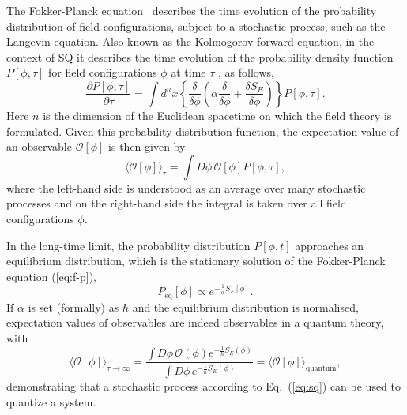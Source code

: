 The Fokker-Planck equation~\cite{risken1996fokker} describes the time evolution of the probability distribution of field configurations, subject to a stochastic process, such as the Langevin equation. Also known as the Kolmogorov forward equation, in the context of SQ it describes the time evolution of the probability density function $P[\phi,\tau]$ for field configurations $\phi$ at time $\tau$ \cite{Damgaard:1987rr,Namiki:1992wf}, as follows,
\begin{equation}
 \frac{\partial P[\phi, \tau]}{\partial \tau} = \int d^nx \left\{
 \frac{\delta}{\delta \phi}
 \left(\alpha\frac{\delta }{\delta \phi} + \frac{\delta S_E}{\delta \phi} \right)
 \right\} P[\phi, \tau].
 \label{eq:f-p}
\end{equation}
Here $n$ is the dimension of the Euclidean spacetime on which the field theory is formulated.  Given this probability distribution function, the expectation value of an observable $\mathcal{O}[\phi]$ is then given by \cite{Damgaard:1987rr}
\begin{equation}
\langle \mathcal{O}[\phi] \rangle_\tau = \int D\phi\,\mathcal{O}[\phi] P[\phi, \tau],
\end{equation}
where the left-hand side is understood as an average over many stochastic processes and on the right-hand side the integral is taken over all field configurations $\phi$. 

In the long-time limit, the probability distribution $P[\phi,t]$ {approaches} an equilibrium distribution, which is the stationary solution of the Fokker-Planck equation (\ref{eq:f-p}), 
\begin{equation}
P_{\text{eq}}[\phi] \propto e^{-\frac{1}{\alpha}S_E[\phi]}.
\label{eq:equ}
\end{equation}
If $\alpha$ is set (formally) as $\hbar$ and the equilibrium distribution is normalised, expectation values of observables are indeed observables in a quantum theory, with
\begin{equation}
\langle \mathcal{O}[\phi] \rangle_{\tau\to\infty} = \frac{\int D\phi \, \mathcal{O}(\phi) e^{-\frac{1}{\hbar}S_E(\phi)}}{\int D\phi \, e^{-\frac{1}{\hbar}S_E(\phi)}}
= \langle \mathcal{O}[\phi] \rangle_{\text{quantum}},
\end{equation}
demonstrating that a stochastic process according to Eq.~(\ref{eq:sq}) can be used to quantize a system.


